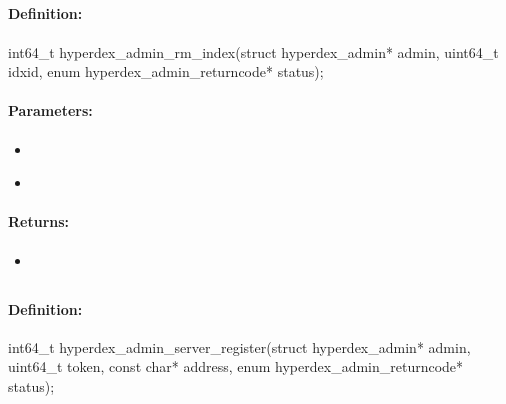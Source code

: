 \pagebreak
\subsection{}
\label{api:c:rm_index}


\paragraph{Definition:}
\begin{ccode}
int64_t hyperdex_admin_rm_index(struct hyperdex_admin* admin,
        uint64_t idxid,
        enum hyperdex_admin_returncode* status);
\end{ccode}

\paragraph{Parameters:}
\begin{itemize}[noitemsep]
\item {}\\

\item {}\\

\end{itemize}

\paragraph{Returns:}
\begin{itemize}[noitemsep]
\item {}\\

\end{itemize}

\pagebreak
\subsection{}
\label{api:c:server_register}


\paragraph{Definition:}
\begin{ccode}
int64_t hyperdex_admin_server_register(struct hyperdex_admin* admin,
        uint64_t token,
        const char* address,
        enum hyperdex_admin_returncode* status);
\end{ccode}

